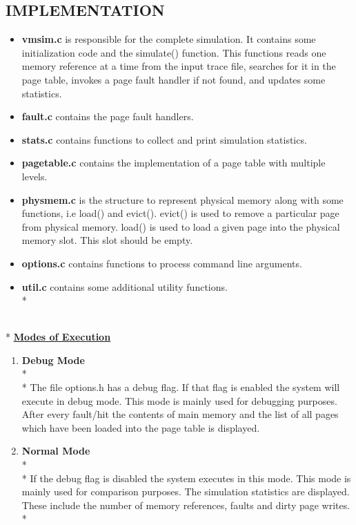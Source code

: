 \documentclass[12pt, oneside, a4paper]{report}
\begin{document}
\subsection*{IMPLEMENTATION}
\begin{itemize}

\item \textbf{vmsim.c} is responsible for the complete simulation. It contains some initialization code and the simulate() function. This functions reads one memory reference at a time from the input trace file, searches for it in the page table, invokes a page fault handler if not found, and updates some statistics.

\item \textbf{fault.c} contains the page fault handlers.

\item \textbf{stats.c} contains functions to collect and print simulation statistics.

\item \textbf{pagetable.c} contains the implementation of a page table with multiple levels.

\item \textbf{physmem.c} is the structure to represent physical memory along with some functions, i.e load() and evict(). evict() is used to remove a particular page from physical memory. load() is used to load a given page into the physical memory slot. This slot should be empty.

\item \textbf{options.c} contains functions to process command line arguments.

\item \textbf{util.c} contains some additional utility functions.
\\*
\end{itemize}
\\*
\underline{\textbf{Modes of Execution}}
\begin{enumerate}
\item \textbf{Debug Mode}
\\*
\\*
The file options.h has a debug flag. If that flag is enabled the system will execute in debug mode. This mode is mainly used for debugging purposes. After every fault/hit the contents of main memory and the list of all pages which have been loaded into the page table is displayed.
\item \textbf{Normal Mode}
\\*
\\*
If the debug flag is disabled the system executes in this mode. This mode is mainly used for comparison purposes. The simulation statistics are displayed. These include the number of memory references, faults and dirty page writes.
\\*
\end{enumerate}   
\end{document}
